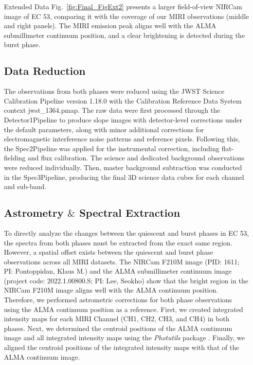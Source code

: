 \documentclass[pdflatex,sn-mathphys-num]{sn-jnl}
\theoremstyle{thmstyleone}
\theoremstyle{thmstyletwo}
\theoremstyle{thmstylethree}
\begin{document}
\begin{bibunit}
Extended Data Fig.~\ref{fig:Final_FigExt2} presents a larger field-of-view NIRCam image of EC 53, comparing it with the coverage of our MIRI observations (middle and right panels). The MIRI emission peak aligns well with the ALMA submillimeter continuum position, and a clear brightening is detected during the burst phase.

\subsection{Data Reduction}\label{data}

The observations from both phases were reduced using the JWST Science Calibration Pipeline version 1.18.0 \citep{Bushouse2023} with the Calibration Reference Data System \citep{Greenfield2016} context jwst\_1364.pmap. The raw data were first processed through the Detector1Pipeline
to produce slope images with detector-level corrections under the default parameters, along
with minor additional corrections for electromagnetic interference noise patterns and reference pixels.
Following this, the Spec2Pipeline was applied for the instrumental correction, including flat-fielding and flux calibration. The science and dedicated background observations were reduced individually. Then, master background subtraction was conducted in the Spec3Pipeline,
producing the final 3D science data cubes for each channel and sub-band.

\subsection{Astrometry $\&$ Spectral Extraction}\label{astro}
To directly analyze the changes between the quiescent and burst phases in EC 53, the spectra from both phases must be extracted from the exact same region. However, a spatial offset exists between the quiescent and burst phase observations across all MIRI datasets.
The NIRCam F210M image (PID: 1611; PI: Pontoppidan, Klaus M.) and the ALMA submillimeter continuum image (project code: 2022.1.00800.S; PI: Lee, Seokho) show that the bright region in the NIRCam F210M image aligns well with the ALMA continuum position.
Therefore, we performed astrometric corrections for both phase observations using the ALMA continuum position as a reference. First, we created integrated intensity maps for each MIRI Channel (CH1, CH2, CH3, and CH4) in both phases. Next, we determined the centroid positions of the ALMA continuum image and all integrated intensity maps using the \textit{Photutils} package \citep{photutils}. Finally, we aligned the centroid positions of the integrated intensity maps with that of the ALMA continuum image.



\end{bibunit}
\end{document}
